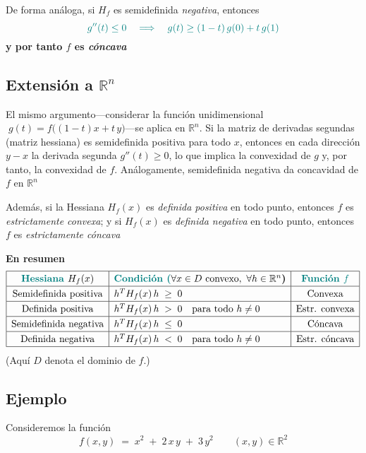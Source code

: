 \documentclass{article}
\newcommand{\R}{\ensuremath{\mathbb{R}}}
\begin{document}
De forma análoga, si \(H_f\) es semidefinida \emph{negativa}, entonces
\[
\color{teal}
g''(t)\le0
\quad\Longrightarrow\quad
g(t)\ge(1-t)\,g(0)+t\,g(1)
\]
\textbf{\color{teal}y por tanto \(f\) es \emph{cóncava}}

\subsection*{Extensión a $\R^n$}
El mismo argumento—considerar la función unidimensional  
\(\;g(t)=f\bigl((1-t)x + t\,y\bigr)\)—se aplica en \(\R^n\). Si la matriz de derivadas segundas (matriz hessiana) es semidefinida positiva para todo \(x\), entonces en cada dirección \(y-x\)  
la derivada segunda \(g''(t)\ge0\), lo que implica la convexidad de \(g\)  
y, por tanto, la convexidad de \(f\). Análogamente, semidefinida negativa  
da concavidad de \(f\) en \(\R^n\)

\noindent Además, si la Hessiana \(H_f(x)\) es \emph{definida positiva} en todo punto, entonces \(f\) es \emph{estrictamente convexa}; y si \(H_f(x)\) es \emph{definida negativa} en todo punto, entonces \(f\) es \emph{estrictamente cóncava}

\noindent\textbf{En resumen}
\[
\renewcommand{\arraystretch}{1.25}
\begin{array}{|c|l|c|}
\hline
\textbf{\color{teal}Hessiana } H_f(x)
  & \textbf{\color{teal}Condición (}\forall x\in D\ \text{convexo},\ \forall h\in\mathbb{R}^n\textbf{)}
  & \textbf{\color{teal}Función \(f\)} \\ \hline
\text{Semidefinida positiva}
  & h^{T} H_f(x)\, h \;\ge\; 0
  & \text{Convexa} \\ \hline
\text{Definida positiva}
  & h^{T} H_f(x)\, h \;>\; 0 \quad \text{para todo } h\neq 0
  & \text{Estr. convexa} \\ \hline
\text{Semidefinida negativa}
  & h^{T} H_f(x)\, h \;\le\; 0
  & \text{Cóncava} \\ \hline
\text{Definida negativa}
  & h^{T} H_f(x)\, h \;<\; 0 \quad \text{para todo } h\neq 0
  & \text{Estr. cóncava} \\ \hline
\end{array}
\]
{\small (Aquí \(D\) denota el dominio de \(f\).)}


\subsection*{Ejemplo}

Consideremos la función
\[
f(x,y) \;=\; x^2 \;+\; 2\,x\,y \;+\; 3\,y^2
\qquad (x,y)\in\R^2
\]
\end{document}
